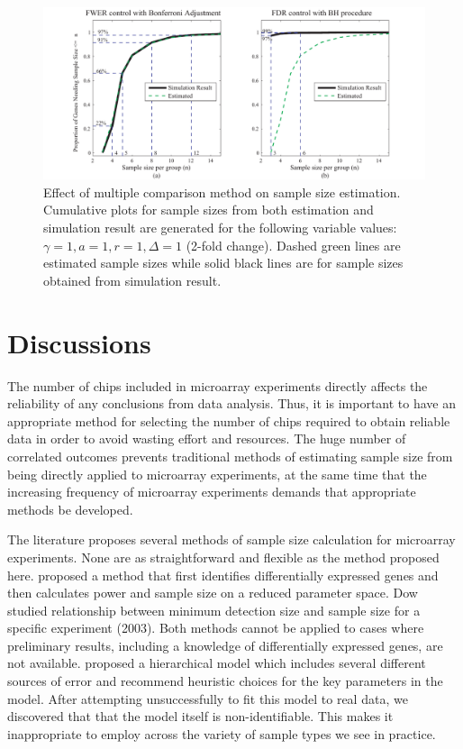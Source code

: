 \documentclass[12pt]{article}
\begin{document}
\begin{figure}%
  \caption[Effect of multiple comparison method on sample size
    estimation] {Effect of multiple comparison method on sample size
    estimation.  Cumulative plots for sample sizes from both
    estimation and simulation result are generated for the following
    variable values: $\gamma = 1, a = 1, r = 1, \Delta = 1$ (2-fold
    change). Dashed green lines are estimated sample sizes while solid
    black lines are for sample sizes obtained from simulation result.}
  \label{fig:ResMtd}
  \centerline{\includegraphics*[width=\textwidth]{ResMtd.pdf}}
\end{figure}

\section{Discussions}

The number of chips included in microarray experiments directly
affects the reliability of any conclusions from data analysis.
Thus, it is important to have an appropriate method for selecting
the number of chips required to obtain reliable data in order to
avoid wasting effort and resources. The huge number of correlated
outcomes prevents traditional methods of estimating sample size
from being directly applied to microarray experiments, at the same
time that the increasing frequency of microarray experiments
demands that appropriate methods be developed.

The literature proposes several methods of sample size calculation
for microarray experiments. None are as straightforward and flexible
as the method proposed here. \citet{Hwang02} proposed a method that
first identifies differentially expressed genes and then calculates
power and sample size on a reduced parameter space. Dow studied
relationship between minimum detection size and sample size for a
specific experiment (2003). Both methods cannot be applied to cases
where preliminary results, including a knowledge of differentially
expressed genes, are not available. \citet{Zien03} proposed a
hierarchical model which includes several different sources of error
and recommend heuristic choices for the key parameters in the model.
After attempting unsuccessfully to fit this model to real data, we
discovered that that the model itself is non-identifiable.  This
makes it inappropriate to employ across the variety of sample types
we see in practice.
\end{document}
